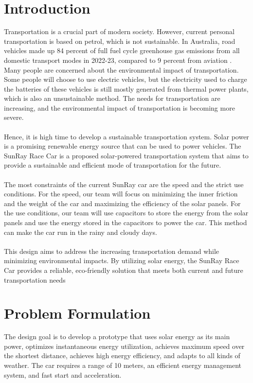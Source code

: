 \documentclass[12pt]{article}
\begin{document}
\tableofcontents
\newpage

\section{Introduction}
Transportation is a crucial part of modern society. 
However, current personal transportation is based on petrol, which is not sustainable. 
In Australia, road vehicles made up 84 percent of full fuel cycle greenhouse gas emissions from all domestic transport modes in 2022-23,
compared to 9 percent from aviation \cite{BITRE2023}. 
\newline
\\
Many people are concerned about the environmental impact of transportation.
Some people will choose to use electric vehicles, but the electricity used to charge the batteries of these vehicles is still mostly generated from thermal power plants, 
which is also an unsustainable method. The needs for transportation are increasing, and the environmental impact of transportation is becoming more severe.
\\
\\
Hence, it is high time to develop a sustainable transportation system.
Solar power is a promising renewable energy source that can be used to power vehicles. 
The SunRay Race Car is a proposed solar-powered transportation system that aims to provide a sustainable and efficient mode of transportation for the future.
\\
\\
The most constraints of the current SunRay car are the speed and the strict use conditions. For the speed, our team will focus on minimizing the inner friction and the weight of the car and
maximizing the efficiency of the solar panels. For the use conditions, our team will use capacitors to store the energy from the solar panels and use the energy stored in the capacitors to power the car.
This method can make the car run in the rainy and cloudy days.
\\
\\
This design aims to address the increasing transportation demand while minimizing environmental impacts. 
By utilizing solar energy, the SunRay Race Car provides a reliable, eco-friendly solution that meets both current and future transportation needs
\section{Problem Formulation}
The design goal is to develop a prototype that uses solar energy as its main power, 
optimizes instantaneous energy utilization, achieves maximum speed over the shortest distance, 
achieves high energy efficiency, and adapts to all kinds of weather. 
The car requires a range of 10 meters, an efficient energy management system, and fast start and acceleration. 
\end{document}
